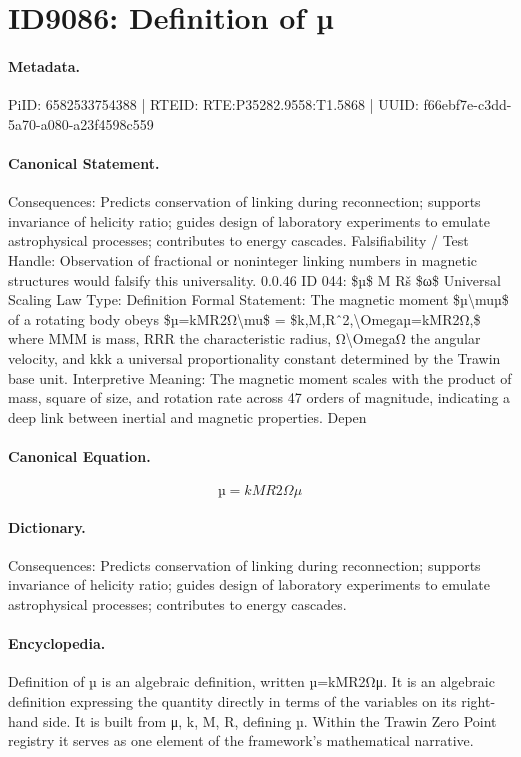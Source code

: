\section*{ID9086: Definition of µ}
\paragraph{Metadata.}
PiID: 6582533754388 | RTEID: RTE:P35282.9558:T1.5868 | UUID: f66ebf7e-c3dd-5a70-a080-a23f4598c559

\paragraph{Canonical Statement.}
Consequences: Predicts conservation of linking during reconnection; supports invariance of helicity ratio; guides design of laboratory experiments to emulate astrophysical processes; contributes to energy cascades. Falsifiability / Test Handle: Observation of fractional or noninteger linking numbers in magnetic structures would falsify this universality. 0.0.46 ID 044: \$µ\$ M Rš \$ω\$ Universal Scaling Law Type: Definition Formal Statement: The magnetic moment \$µ\textbackslash{}muµ\$ of a rotating body obeys \$µ=kMR2Ω\textbackslash{}mu\$ = \$k,M,Rˆ2,\textbackslash{}Omegaµ=kMR2Ω,\$ where MMM is mass, RRR the characteristic radius, Ω\textbackslash{}OmegaΩ the angular velocity, and kkk a universal proportionality constant determined by the Trawin base unit. Interpretive Meaning: The magnetic moment scales with the product of mass, square of size, and rotation rate across 47 orders of magnitude, indicating a deep link between inertial and magnetic properties. Depen

\paragraph{Canonical Equation.}
\[
µ=kMR2Ω\mu
\]

\paragraph{Dictionary.}
Consequences: Predicts conservation of linking during reconnection; supports invariance of helicity ratio; guides design of laboratory experiments to emulate astrophysical processes; contributes to energy cascades.

\paragraph{Encyclopedia.}
Definition of µ is an algebraic definition, written µ=kMR2Ωμ. It is an algebraic definition expressing the quantity directly in terms of the variables on its right-hand side. It is built from μ, k, M, R, defining µ. Within the Trawin Zero Point registry it serves as one element of the framework's mathematical narrative.
